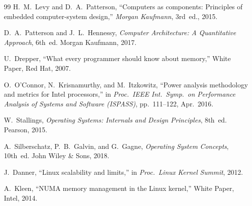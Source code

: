 \documentclass[conference]{IEEEtran}
\begin{document}
\begin{thebibliography}{99}
H.~M.~Levy and D.~A.~Patterson,
``Computers as components: Principles of embedded computer-system design,''
\emph{Morgan Kaufmann}, 3rd~ed., 2015.

D.~A.~Patterson and J.~L.~Hennessy,
\emph{Computer Architecture: A Quantitative Approach}, 6th~ed.
Morgan Kaufmann, 2017.

U.~Drepper,
``What every programmer should know about memory,''
White Paper, Red Hat, 2007.

O.~O'Connor, N.~Krisnamurthy, and M.~Itzkowitz,
``Power analysis methodology and metrics for Intel processors,''
in \emph{Proc.\ IEEE Int.\ Symp.\ on Performance Analysis of Systems
and Software (ISPASS)}, pp.~111--122, Apr.~2016.

W.~Stallings,
\emph{Operating Systems: Internals and Design Principles}, 8th~ed.
Pearson, 2015.

A.~Silberschatz, P.~B.~Galvin, and G.~Gagne,
\emph{Operating System Concepts}, 10th~ed.
John Wiley \& Sons, 2018.

J.~Danner,
``Linux scalability and limits,''
in \emph{Proc.\ Linux Kernel Summit}, 2012.

A.~Kleen,
``NUMA memory management in the Linux kernel,''
White Paper, Intel, 2014.

\end{thebibliography}
\end{document}
